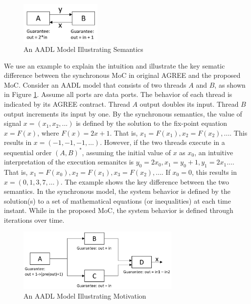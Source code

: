 \begin{figure}[ht!]
\centering
\includegraphics[width=40mm]{example1.jpg}
\caption{An AADL Model Illustrating Semantics\label{motivationFig1}}
\end{figure}

We use an example to explain the intuition and illustrate the key sematic difference between the synchronous MoC in original AGREE and the proposed MoC.
Consider an AADL model that consists of two threads $A$ and $B$, as shown in Figure \ref{motivationFig1}. Assume all ports are data ports. The behavior of each thread is indicated by its AGREE contract. Thread $A$ output doubles its input. Thread $B$ output increments its input by one. By the synchronous semantics, the value of signal $x = (x_1, x_2, ...)$ is defined by the solution to the fix-point equation $x = F(x)$, where $F(x) = 2x + 1$. That is, $x_1 = F(x_1), x_2 = F(x_2),...$. This results in $x = (-1, -1, -1,…)$. However, if the two threads execute in a sequential order $(A,B)^*$, assuming the initial value of $x$ as $x_0$, an intuitive interpretation of the execution semanitcs is $y_0 = 2x_0, x_1 = y_0+1, y_1 = 2x_1...$. That is, $x_1 = F(x_0), x_2 = F(x_1), x_3 = F(x_2),...$. If $x_0 = 0$, this results in $x = (0, 1, 3, 7,…)$. The example shows the key difference between the two semantics. In the synchronous model, the system behavior is defined by the solution(s) to a set of mathematical equations (or inequalities) at each time instant. While in the proposed MoC, the system behavior is defined through iterations over time.

\begin{figure}[ht!]
\centering
\includegraphics[width=80mm]{motivationalexample1.jpg}
\caption{An AADL Model Illustrating Motivation\label{motivationFig2}}
\end{figure}

